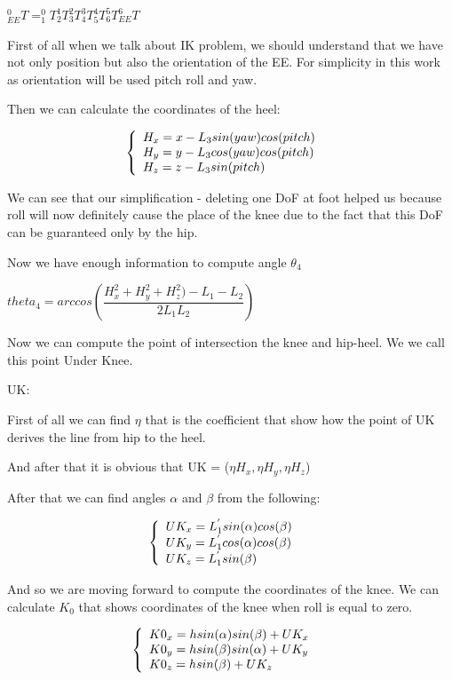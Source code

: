 \documentclass[12pt]{article}
\begin{document}
$^0_{EE}T = ^0_{1}T ^1_{2}T ^2_{3}T ^3_{4}T ^4_{5}T ^5_{6}T ^6_{EE}T$

\bigskip 

First of all when we talk about IK problem, we should understand that we have not only position but also the orientation of the EE. For simplicity in this work as orientation will be used pitch roll and yaw.

Then we can calculate the coordinates of the heel:

$$
	\left\{
	\begin{array}{l l}
		H_x = x - L_3 sin(yaw) cos(pitch) &\\
		H_y = y - L_3 cos(yaw) cos(pitch) &\\
		H_z = z - L_3 sin(pitch) & 
	\end{array}
	\right.
$$

We can see that our simplification - deleting one DoF at foot helped us because roll will now definitely  cause the place of the knee due to the fact that this DoF can be guaranteed only by the hip.

Now we have enough information to compute angle $\theta_4$

$theta_4 = arccos \left( \dfrac{H^2_x + H^2_y + H^2_z) - L_1 - L_2}{2 L_1 L_2} \right)$

Now we can compute the point of intersection the knee and hip-heel. We we call this point Under Knee.

UK:

First of all we can find $\eta$ that is the coefficient that show how the point of UK derives the line from hip to the heel.

And after that it is obvious that UK = ($\eta H_x, \eta H_y, \eta H_z$)

After that we can find angles $\alpha$ and $\beta$ from the following: 

$$
	\left\{
	\begin{array}{l l}
		UK_x = L^{'}_1 sin(\alpha) cos(\beta) &\\
		UK_y = L^{'}_1 cos(\alpha) cos(\beta) &\\
		UK_z = L^{'}_1 sin(\beta) & 
	\end{array}
	\right.
$$

And so we are moving forward to compute the coordinates of the knee. We can calculate $K_0$ that shows coordinates of the knee when roll is equal to zero.

$$
	\left\{
	\begin{array}{l l}
		K0_x = h sin(\alpha) sin(\beta) + UK_x &\\
		K0_y = h sin(\beta) sin(\alpha) + UK_y &\\
		K0_z = h sin(\beta) + UK_z& 
	\end{array}
	\right.
$$
\end{document}
